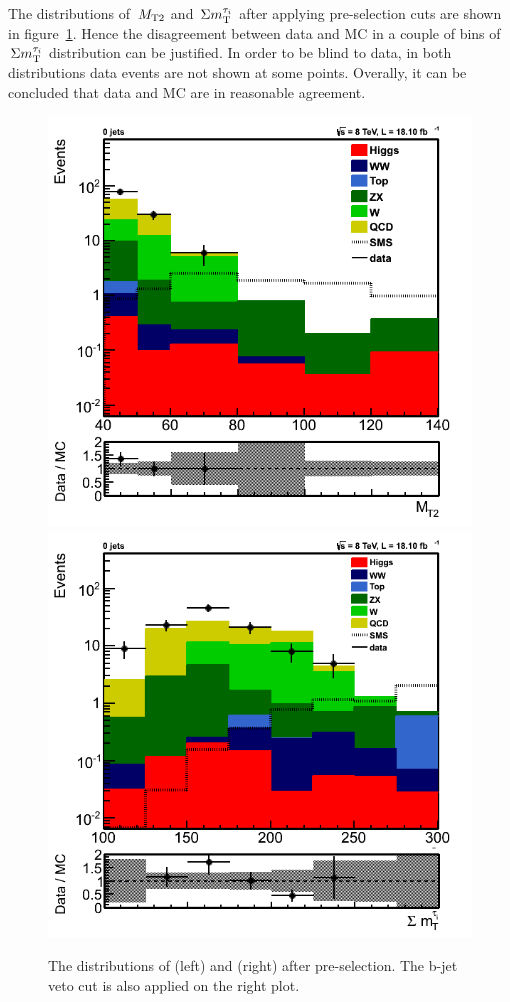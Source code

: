 The distributions of $\,{M_{\rm T2}}$ and $\,\Sigma m_{\rm T}^{\tau_i}$ after applying pre-selection cuts are shown in figure~\ref{fig:comparison}.  Hence the disagreement between data and MC in a couple of bins of $\,\Sigma m_{\rm T}^{\tau_i}$ distribution can be justified. In order to be blind to data, in both distributions data events are not shown at some points. Overally, it can be concluded that data and MC are in reasonable agreement. 
\begin{figure}[htbp]
\centering
\includegraphics[angle=0,scale=0.35]{QCDbginTauTau/Bin1_QCDdatadriven_Samesign.png}
\includegraphics[angle=0,scale=0.35]{QCDbginTauTau/Bin2_QCDdatadriven_Samesign.png} \\
\caption{The distributions of \mttwo (left) and \SumMT (right) after pre-selection. The b-jet veto cut is also applied on the right plot.}
\label{fig:comparison}
\end{figure}

